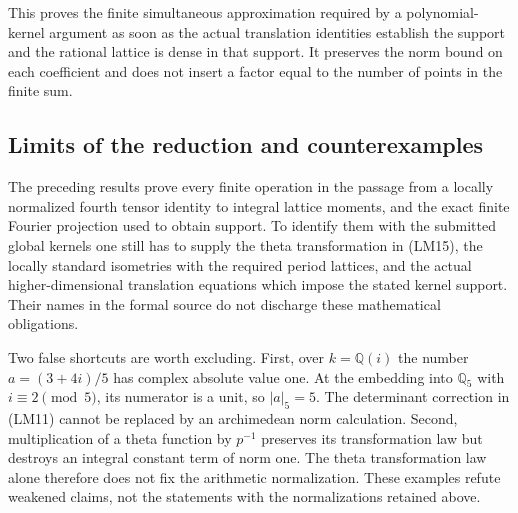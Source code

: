 This proves the finite simultaneous approximation required by a
polynomial-kernel argument as soon as the actual translation
identities establish the support and the rational lattice is
dense in that support.  It preserves the norm bound on each
coefficient and does not insert a factor equal to the number
of points in the finite sum.

\subsection{Limits of the reduction and counterexamples}

The preceding results prove every finite operation in the
passage from a locally normalized fourth tensor identity to
integral lattice moments, and the exact finite Fourier
projection used to obtain support.  To identify them with the
submitted global kernels one still has to supply the theta
transformation in (LM15), the locally standard isometries with
the required period lattices, and the actual higher-dimensional
translation equations which impose the stated kernel support.
Their names in the formal source do not discharge these
mathematical obligations.

Two false shortcuts are worth excluding.  First, over
$k=\mathbb Q(i)$ the number $a=(3+4i)/5$ has complex
absolute value one.  At the embedding into $\mathbb Q_5$
with $i\equiv2\pmod5$, its numerator is a unit, so
$|a|_5=5$.  The determinant correction in (LM11) cannot be
replaced by an archimedean norm calculation.
Second, multiplication of a theta function by $p^{-1}$
preserves its transformation law but destroys an integral
constant term of norm one.  The theta transformation law
alone therefore does not fix the arithmetic normalization.
These examples refute weakened claims, not the statements
with the normalizations retained above.


